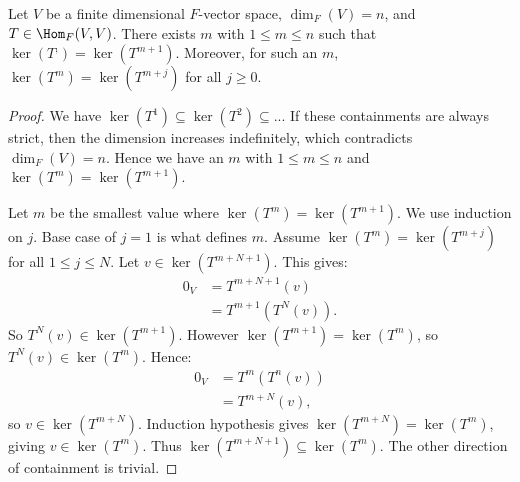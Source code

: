     \begin{lemma}\label{lemma:eventual-kernel}
        Let $V$ be a finite dimensional $F$-vector space, $\dim_F{(V)} = n$, and $T \in \Hom_F{(V,V)}$. There exists $m$ with $1 \leq m \leq n$ such that $\ker(T^,) = \ker(T^{m+1})$. Moreover, for such an $m$, $\ker(T^m) = \ker(T^{m+j})$ for all $j \geq 0$.
    \end{lemma}
        \begin{proof}
            We have $\ker(T^1) \subseteq \ker(T^2) \subseteq...$ If these containments are always strict, then the dimension increases indefinitely, which contradicts $\dim_F(V) = n$. Hence we have an $m$ with $1 \leq m \leq n$ and $\ker(T^m) = \ker(T^{m+1})$.

            Let $m$ be the smallest value where $\ker(T^m) = \ker(T^{m+1})$. We use induction on $j$. Base case of $j=1$ is what defines $m$. Assume $\ker(T^m) = \ker(T^{m+j})$ for all $1 \leq j \leq N$. Let $v \in \ker(T^{m+N+1})$. This gives:
                \begin{equation*}
                \begin{split}
                    0_V 
                    & = T^{m+N+1}(v) \\
                    & = T^{m+1}(T^N(v)).
                \end{split}
                \end{equation*}
            So $T^N(v) \in \ker(T^{m+1})$. However $\ker(T^{m+1}) = \ker(T^{m})$, so $T^N(v) \in \ker(T^{m})$. Hence:
                \begin{equation*}
                \begin{split}
                    0_V 
                    & = T^m(T^n(v)) \\
                    & = T^{m+N}(v), 
                \end{split}
                \end{equation*}
            so $v \in \ker(T^{m+N})$. Induction hypothesis gives $\ker(T^{m+N}) = \ker(T^m)$, giving $v \in \ker{(T^m)}$. Thus $\ker(T^{m+N+1}) \subseteq \ker(T^m)$. The other direction of containment is trivial.
        \end{proof}


